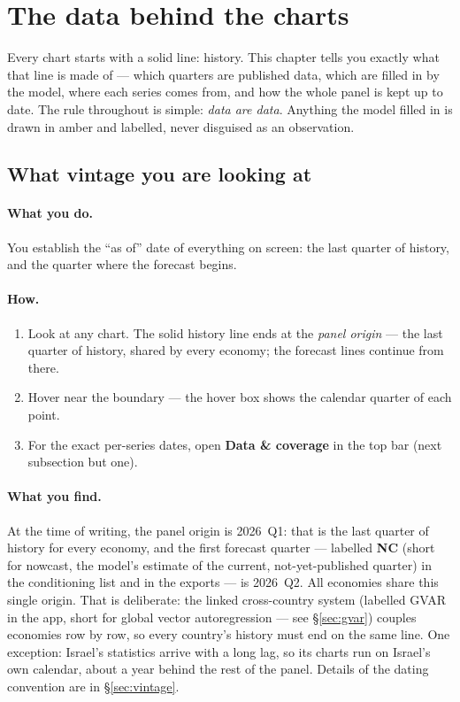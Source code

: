 \documentclass[11pt]{article}
\theoremstyle{definition}
\theoremstyle{remark}
\begin{document}
\section{The data behind the charts}\label{sec:use-data}

Every chart starts with a solid line: history. This chapter tells you exactly what
that line is made of --- which quarters are published data, which are filled in by
the model, where each series comes from, and how the whole panel is kept up to date.
The rule throughout is simple: \emph{data are data}. Anything the model filled in is
drawn in amber and labelled, never disguised as an observation.

\subsection{What vintage you are looking at}

\paragraph{What you do.}
You establish the ``as of'' date of everything on screen: the last quarter of
history, and the quarter where the forecast begins.

\paragraph{How.}
\begin{enumerate}
  \item Look at any chart. The solid history line ends at the \emph{panel
    origin} --- the last quarter of history, shared by every economy; the
    forecast lines continue from there.
  \item Hover near the boundary --- the hover box shows the calendar quarter of
    each point.
  \item For the exact per-series dates, open \textbf{Data \& coverage}
    in the top bar (next subsection but one).
\end{enumerate}

\paragraph{What you find.}
At the time of writing, the panel origin is 2026~Q1: that is the last quarter of
history for every economy, and the first forecast quarter --- labelled \textbf{NC}
(short for nowcast, the model's estimate of the current, not-yet-published
quarter) in the conditioning list and in the exports --- is 2026~Q2. All economies
share this single origin. That is deliberate: the linked cross-country system
(labelled GVAR in the app, short for global vector autoregression --- see
\S\ref{sec:gvar}) couples economies row by row, so every country's history must end
on the same line. One exception: Israel's statistics arrive with a long lag,
so its charts run on Israel's own calendar, about a year behind the rest of the
panel. Details of the dating convention are in \S\ref{sec:vintage}.
\end{document}

